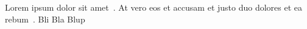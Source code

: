 \documentclass[]{article}
\begin{document}
    Lorem ipsum dolor sit amet~\citep{Silberschatz2005}.
    At vero eos et accusam et justo duo dolores et ea rebum~\citet{Silberschatz2005}.
    Bli Bla Blup \cite{Silberschatz2005}

    \clearpage
    \printbibliography 
\end{document}
